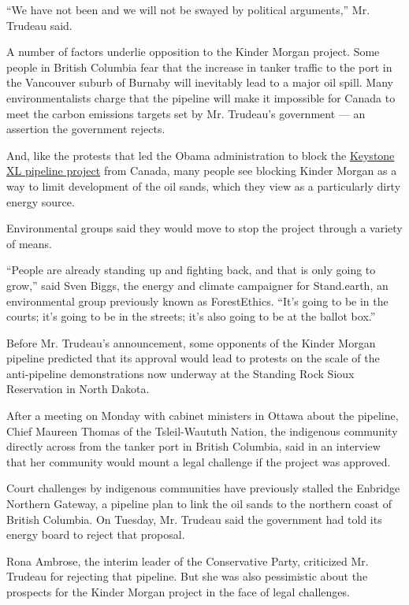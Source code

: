 ``We have not been and we will not be swayed by political arguments,''
Mr. Trudeau said.

A number of factors underlie opposition to the Kinder Morgan project.
Some people in British Columbia fear that the increase in tanker traffic
to the port in the Vancouver suburb of Burnaby will inevitably lead to a
major oil spill. Many environmentalists charge that the pipeline will
make it impossible for Canada to meet the carbon emissions targets set
by Mr. Trudeau's government --- an assertion the government rejects.

And, like the protests that led the Obama administration to block the
\href{http://www.nytimes.com/topic/subject/keystone-xl-pipeline?8qa}{Keystone
XL pipeline project} from Canada, many people see blocking Kinder Morgan
as a way to limit development of the oil sands, which they view as a
particularly dirty energy source.

Environmental groups said they would move to stop the project through a
variety of means.

``People are already standing up and fighting back, and that is only
going to grow,'' said Sven Biggs, the energy and climate campaigner for
Stand.earth, an environmental group previously known as ForestEthics.
``It's going to be in the courts; it's going to be in the streets; it's
also going to be at the ballot box.''

Before Mr. Trudeau's announcement, some opponents of the Kinder Morgan
pipeline predicted that its approval would lead to protests on the scale
of the anti-pipeline demonstrations now underway at the Standing Rock
Sioux Reservation in North Dakota.

After a meeting on Monday with cabinet ministers in Ottawa about the
pipeline, Chief Maureen Thomas of the Tsleil-Waututh Nation, the
indigenous community directly across from the tanker port in British
Columbia, said in an interview that her community would mount a legal
challenge if the project was approved.

Court challenges by indigenous communities have previously stalled the
Enbridge Northern Gateway, a pipeline plan to link the oil sands to the
northern coast of British Columbia. On Tuesday, Mr. Trudeau said the
government had told its energy board to reject that proposal.

Rona Ambrose, the interim leader of the Conservative Party, criticized
Mr. Trudeau for rejecting that pipeline. But she was also pessimistic
about the prospects for the Kinder Morgan project in the face of legal
challenges.


